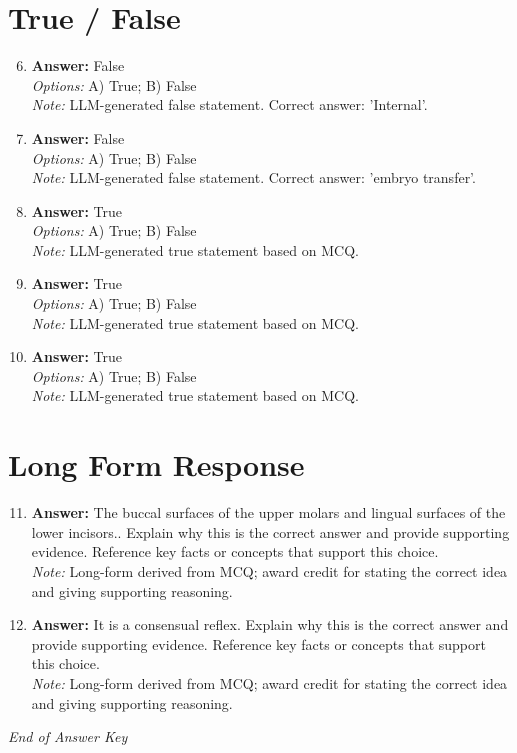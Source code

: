 \documentclass[12pt]{article}
\begin{document}
\section*{True / False}
\begin{enumerate}[label=\arabic*.]
\setcounter{enumi}{5}
\item \textbf{Answer:} False
\\ \textit{Options:} A) True; B) False
\\ \textit{Note:} LLM-generated false statement. Correct answer: 'Internal'.
\item \textbf{Answer:} False
\\ \textit{Options:} A) True; B) False
\\ \textit{Note:} LLM-generated false statement. Correct answer: 'embryo transfer'.
\item \textbf{Answer:} True
\\ \textit{Options:} A) True; B) False
\\ \textit{Note:} LLM-generated true statement based on MCQ.
\item \textbf{Answer:} True
\\ \textit{Options:} A) True; B) False
\\ \textit{Note:} LLM-generated true statement based on MCQ.
\item \textbf{Answer:} True
\\ \textit{Options:} A) True; B) False
\\ \textit{Note:} LLM-generated true statement based on MCQ.
\end{enumerate}

\section*{Long Form Response}
\begin{enumerate}[label=\arabic*.]
\setcounter{enumi}{10}
\item \textbf{Answer:} The buccal surfaces of the upper molars and lingual surfaces of the lower incisors.. Explain why this is the correct answer and provide supporting evidence. Reference key facts or concepts that support this choice.
\\ \textit{Note:} Long-form derived from MCQ; award credit for stating the correct idea and giving supporting reasoning.
\item \textbf{Answer:} It is a consensual reflex. Explain why this is the correct answer and provide supporting evidence. Reference key facts or concepts that support this choice.
\\ \textit{Note:} Long-form derived from MCQ; award credit for stating the correct idea and giving supporting reasoning.
\end{enumerate}

\vfill
\noindent\textit{End of Answer Key}
\end{document}
